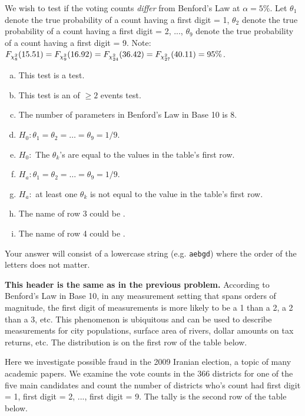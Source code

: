 \documentclass[12pt,landscape]{article}
\newcommand{\instr}{\small Your answer will consist of a lowercase string (e.g. \texttt{aebgd}) where the order of the letters does not matter. \normalsize}
\begin{document}
We wish to test if the voting counts \emph{differ} from Benford's Law at $\alpha = 5\%$. Let $\theta_1$ denote the true probability of a count having a first digit = 1, $\theta_2$ denote the true probability of a count having a first digit = 2, ..., $\theta_9$ denote the true probability of a count having a first digit = 9. Note: $F_{\chi^2_{8}}(15.51) = F_{\chi^2_{9}}(16.92) = F_{\chi^2_{24}}(36.42) = F_{\chi^2_{27}}(40.11) = 95\%$.

\vspace{-0.2cm}\benum{} 

\begin{enumerate}[(a)]
\item This test is a  test.
\item This test is an  of $\geq 2$ events test.
\item The number of parameters in Benford's Law in Base 10 is 8.
\item $H_0: \theta_1 = \theta_2 = \ldots = \theta_9 = 1/9$.
\item $H_0:$ The $\theta_k$'s are equal to the values in the table's first row.
\item $H_a: \theta_1 = \theta_2 = \ldots = \theta_9 = 1/9$.
\item $H_a:$ at least one $\theta_k$ is not equal to the value in the table's first row.
\item The name of row 3 could be .
\item The name of row 4 could be .
\end{enumerate}
\eenum\instr\pagebreak



\problem{} \textbf{This header is the same as in the previous problem.} According to Benford's Law in Base 10, in any measurement setting that spans orders of magnitude, the first digit of measurements is more likely to be a 1 than a 2, a 2 than a 3, etc. This phenomenon is ubiquitous and can be used to describe measurements for city populations, surface area of rivers, dollar amounts on tax returns, etc. The distribution is on the first row of the table below.

Here we investigate possible fraud in the 2009 Iranian election, a topic of many academic papers. We examine the vote counts in the 366 districts for one of the five main candidates and count the number of districts who's count had first digit = 1, first digit = 2, ..., first digit = 9. The tally is the second row of the table below. 
\end{document}

